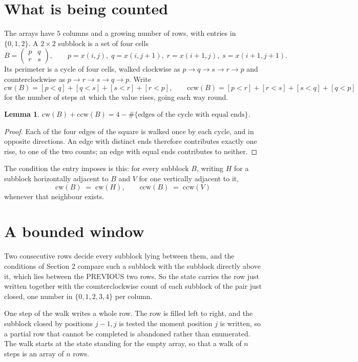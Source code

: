 \documentclass[11pt,a4paper]{article}
\theoremstyle{plain}
\newtheorem{lemma}[theorem]{Lemma}
\theoremstyle{definition}
\begin{document}
\section{What is being counted}

The arrays have $5$ columns and a growing number of rows, with entries in $\{0,1,2\}$. A
$2\times2$ subblock is a set of four cells
\[
B=\begin{pmatrix} p & q \\ r & s \end{pmatrix},
\qquad p=x(i,j),\; q=x(i,j+1),\; r=x(i+1,j),\; s=x(i+1,j+1).
\]
Its perimeter is a cycle of four cells, walked clockwise as $p\to q\to s\to r\to p$ and
counterclockwise as $p\to r\to s\to q\to p$. Write
\[
\mathrm{cw}(B)=[p<q]+[q<s]+[s<r]+[r<p],\qquad
\mathrm{ccw}(B)=[p<r]+[r<s]+[s<q]+[q<p]
\]
for the number of steps at which the value rises, going each way round.

\begin{lemma}\label{lem:sum}
$\mathrm{cw}(B)+\mathrm{ccw}(B)=4-\#\{\text{edges of the cycle with equal ends}\}$.
\end{lemma}

\begin{proof}
Each of the four edges of the square is walked once by each cycle, and in opposite directions.
An edge with distinct ends therefore contributes exactly one rise, to one of the two counts;
an edge with equal ends contributes to neither.
\end{proof}

The condition the entry imposes is this: for every subblock $B$, writing $H$ for a subblock horizontally adjacent to $B$ and $V$ for one vertically adjacent to it,
\[
\mathrm{cw}(B)\;=\;\mathrm{cw}(H),\qquad \mathrm{ccw}(B)\;=\;\mathrm{ccw}(V)
\]
whenever that neighbour exists.

\section{A bounded window}

Two consecutive rows decide every subblock lying between them, and the conditions of Section 2 compare such a subblock with the subblock directly above it, which lies between the PREVIOUS two rows. So the state carries the row just written together with the counterclockwise count of each subblock of the pair just closed, one number in $\{0,1,2,3,4\}$ per column.

One step of the walk writes a whole row. The row is filled left to right, and the subblock
closed by positions $j-1,j$ is tested the moment position $j$ is written, so a partial row that
cannot be completed is abandoned rather than enumerated. The walk starts at the state standing
for the empty array, so that a walk of $n$ steps is an array of $n$ rows.
\end{document}
